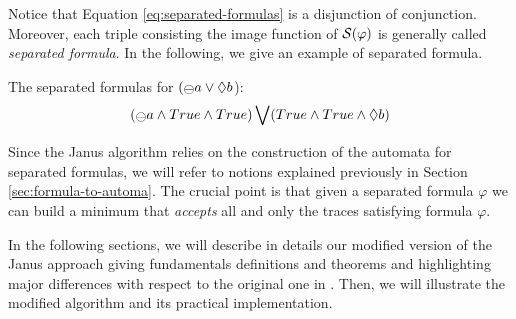 Notice that Equation \ref{eq:separated-formulas} is a disjunction of conjunction. Moreover, each triple consisting the image function of $\S(\varphi)$ is generally called \emph{separated formula}. In the following, we give an example of separated formula.
\begin{example}\label{ex:separated-formulas}
The separated formulas for $(\Yesterday a \lOR \Diamond b$):
\begin{align*}
(\Yesterday a \lAND True \lAND True)\bigvee(True \lAND True \lAND \Diamond b)
\end{align*}
\end{example}

Since the Janus algorithm relies on the construction of the automata for separated \LTLp formulas, we will refer to notions explained previously in Section \ref{sec:formula-to-automa}. The crucial point is that given a separated \LTLp formula $\varphi$ we can build a minimum \DFA that \emph{accepts} all and only the traces satisfying formula $\varphi$.

In the following sections, we will describe in details our modified version of the Janus approach giving fundamentals definitions and theorems and highlighting major differences with respect to the original one in  \citep{cecconi2018interestingness}. Then, we will illustrate the modified algorithm and its practical implementation.

